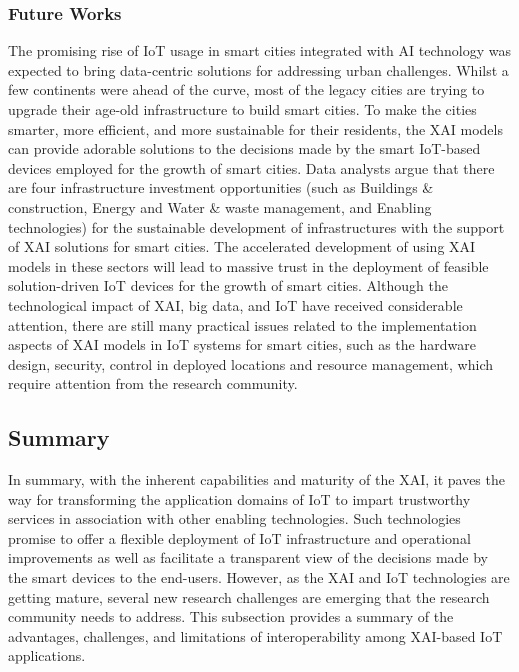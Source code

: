 \documentclass[journal]{IEEEtran}
\begin{document}
\subsubsection{Future Works}
The promising rise of IoT usage in smart cities integrated with AI technology was expected to bring data-centric solutions for addressing urban challenges. Whilst a few continents were ahead of the curve, most of the legacy cities are trying to upgrade their age-old infrastructure to build smart cities. To make the cities smarter, more efficient, and more sustainable for their residents, the XAI models can provide adorable solutions to the decisions made by the smart IoT-based devices employed for the growth of smart cities. Data analysts argue that there are four infrastructure investment opportunities (such as Buildings \& construction, Energy and Water \& waste management, and Enabling technologies) for the sustainable development of infrastructures with the support of XAI solutions for smart cities. The accelerated development of using XAI models in these sectors will lead to massive trust in the deployment of feasible solution-driven IoT devices for the growth of smart cities. Although the technological impact of XAI, big data, and IoT have received considerable attention, there are still many practical issues related to the implementation aspects of XAI models in IoT systems for smart cities, such as the hardware design, security, control in deployed locations and resource management, which require attention from the research community.

\subsection{Summary}

In summary, with the inherent capabilities and maturity of the XAI, it paves the way for transforming the application domains of IoT to impart trustworthy services in association with other enabling technologies. Such technologies promise to offer a flexible deployment of IoT infrastructure and operational improvements as well as facilitate a transparent view of the decisions made by the smart devices to the end-users. However, as the XAI and IoT technologies are getting mature, several new research challenges are emerging that the research community needs to address. This subsection provides a summary of the advantages, challenges, and limitations of interoperability among XAI-based IoT applications. 
\end{document}
